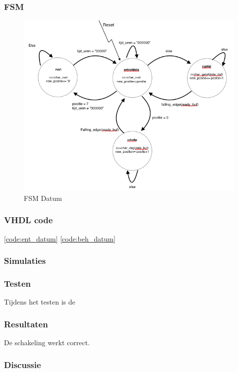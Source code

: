 \subsubsection{FSM}
\begin{figure}
  \centering
     \includegraphics[angle = 0, scale= 0.75]{verslag_schemas/datum_fsm.png}
       \caption{FSM Datum}
\label{fig:simlayout}
\end{figure}

\subsubsection{VHDL code}
\ref{code:ent_datum}
\ref{code:beh_datum}
\subsubsection{Simulaties}

\subsubsection{Testen}
Tijdens het testen is de
\subsubsection{Resultaten}
De schakeling werkt correct. 
\subsubsection{Discussie}
